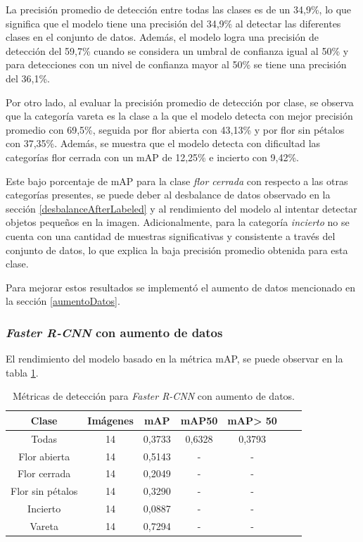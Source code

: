 La precisión promedio de detección entre todas las clases es de un 34,9\%, lo que significa que el modelo tiene una precisión del 34,9\% al detectar las diferentes clases en el conjunto de datos. Además, el modelo logra una precisión de detección del 59,7\% cuando se considera un umbral de confianza igual al 50\% y para detecciones con un nivel de confianza mayor al 50\% se tiene una precisión del 36,1\%.

Por otro lado, al evaluar la precisión promedio de detección por clase, se observa que la categoría vareta es la clase a la que el modelo detecta con mejor precisión promedio con 69,5\%, seguida por flor abierta con 43,13\% y por flor sin pétalos con 37,35\%. Además, se muestra que el modelo detecta con dificultad las categorías flor cerrada con un mAP de 12,25\% e incierto con 9,42\%.

Este bajo porcentaje de mAP para la clase \textit{flor cerrada} con respecto a las otras categorías presentes, se puede deber al desbalance de datos observado en la sección \ref{desbalanceAfterLabeled} y al rendimiento del modelo al intentar detectar objetos pequeños en la imagen. Adicionalmente, para la categoría \textit{incierto} no se cuenta con una cantidad de muestras significativas y consistente a través del conjunto de datos, lo que explica la baja precisión promedio obtenida para esta clase.

Para mejorar estos resultados se implementó el aumento de datos mencionado en la sección \ref{aumentoDatos}.

\subsubsection{\textit{Faster R-CNN} con aumento de datos}

El rendimiento del modelo basado en la métrica mAP, se puede observar en la tabla \ref{tab:resultadosFasterConAug}. 

\begin{table}[h]
	\centering
	\caption{Métricas de detección para \textit{Faster R-CNN} con aumento de datos.}
	\begin{tabular}{c c c c c c c}    
		\toprule
		\textbf{Clase}&\textbf{Imágenes}&\textbf{mAP}&\textbf{mAP50}&\textbf{mAP> 50}\\
		\midrule
		Todas & 14 & 0,3733 & 0,6328 & 0,3793\\
		Flor abierta & 14 & 0,5143 & - & - \\
		Flor cerrada & 14 & 0,2049 & - & - \\
		Flor sin pétalos & 14 & 0,3290 & - & - \\
		Incierto & 14 & 0,0887 & - & - \\
		Vareta & 14 & 0,7294 & - & - \\		
		\bottomrule
		\hline
	\end{tabular}
	\label{tab:resultadosFasterConAug}
\end{table}

